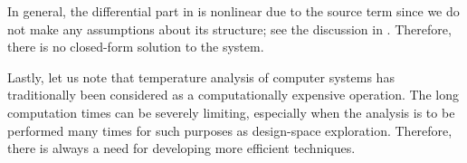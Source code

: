 In general, the differential part in  is
nonlinear due to the source term \vp since we do not make any assumptions about
its structure; see the discussion in . Therefore, there is no
closed-form solution to the system.

Lastly, let us note that temperature analysis of computer systems has
traditionally been considered as a computationally expensive operation. The long
computation times can be severely limiting, especially when the analysis is to
be performed many times for such purposes as design-space exploration.
Therefore, there is always a need for developing more efficient techniques.
